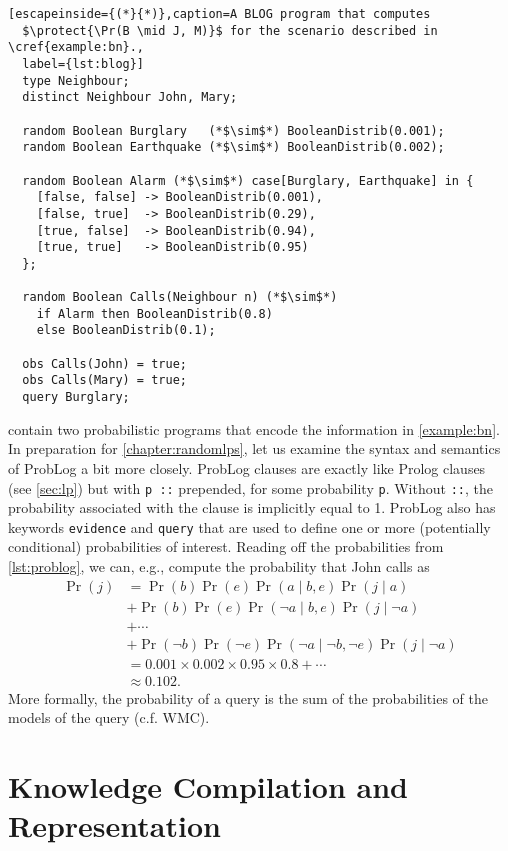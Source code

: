 \begin{lstlisting}[escapeinside={(*}{*)},caption=A BLOG program that computes
  $\protect{\Pr(B \mid J, M)}$ for the scenario described in \cref{example:bn}.,
  label={lst:blog}]
  type Neighbour;
  distinct Neighbour John, Mary;

  random Boolean Burglary   (*$\sim$*) BooleanDistrib(0.001);
  random Boolean Earthquake (*$\sim$*) BooleanDistrib(0.002);

  random Boolean Alarm (*$\sim$*) case[Burglary, Earthquake] in {
    [false, false] -> BooleanDistrib(0.001),
    [false, true]  -> BooleanDistrib(0.29),
    [true, false]  -> BooleanDistrib(0.94),
    [true, true]   -> BooleanDistrib(0.95)
  };

  random Boolean Calls(Neighbour n) (*$\sim$*)
    if Alarm then BooleanDistrib(0.8)
    else BooleanDistrib(0.1);

  obs Calls(John) = true;
  obs Calls(Mary) = true;
  query Burglary;
\end{lstlisting}

 contain two probabilistic programs that encode the
information in \cref{example:bn}. In preparation for \cref{chapter:randomlps},
let us examine the syntax and semantics of ProbLog a bit more closely. ProbLog
clauses are exactly like Prolog clauses (see \cref{sec:lp}) but with \verb+p ::+
prepended, for some probability \texttt{p}. Without \verb+::+, the probability
associated with the clause is implicitly equal to 1. ProbLog also has keywords
\texttt{evidence} and \texttt{query} that are used to define one or more
(potentially conditional) probabilities of interest. Reading off the
probabilities from \cref{lst:problog}, we can, e.g., compute the probability
that John calls as
\begin{align*}
  \Pr(j) &= \Pr(b)\Pr(e)\Pr(a \mid b, e)\Pr(j \mid a) \\
  &+ \Pr(b)\Pr(e)\Pr(\neg a \mid b, e)\Pr(j \mid \neg a) \\
  &+ \cdots \\
  &+ \Pr(\neg b)\Pr(\neg e)\Pr(\neg a \mid \neg b, \neg e)\Pr(j \mid \neg a) \\
  &= 0.001 \times 0.002 \times 0.95 \times 0.8 + \cdots \\
  &\approx 0.102.
\end{align*}
More formally, the probability of a query is the sum of the probabilities of the
models of the query (c.f. WMC).

\section{Knowledge Compilation and Representation}\label{sec:kc}

